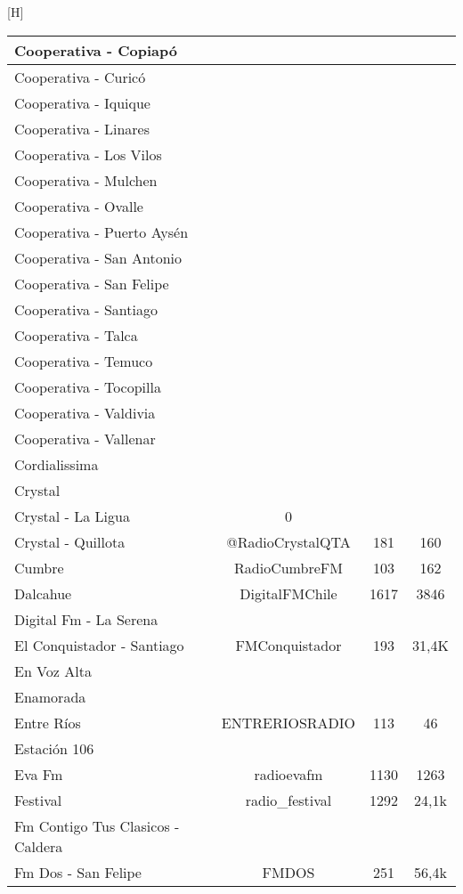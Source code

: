 \begin{center}[H]
\begin{longtable}{| l | c | c | c |}
Cooperativa - Copiapó	&		&		&		\\ \hline
Cooperativa - Curicó	&		&		&		\\ \hline
Cooperativa - Iquique	&		&		&		\\ \hline
Cooperativa - Linares	&		&		&		\\ \hline
Cooperativa - Los Vilos	&		&		&		\\ \hline
Cooperativa - Mulchen	&		&		&		\\ \hline
Cooperativa - Ovalle	&		&		&		\\ \hline
Cooperativa - Puerto Aysén	&		&		&		\\ \hline
Cooperativa - San Antonio	&		&		&		\\ \hline
Cooperativa - San Felipe	&		&		&		\\ \hline
Cooperativa - Santiago	&		&		&		\\ \hline
Cooperativa - Talca	&		&		&		\\ \hline
Cooperativa - Temuco	&		&		&		\\ \hline
Cooperativa - Tocopilla	&		&		&		\\ \hline
Cooperativa - Valdivia	&		&		&		\\ \hline
Cooperativa - Vallenar	&		&		&		\\ \hline
Cordialissima	&		&		&		\\ \hline
Crystal	&		&		&		\\ \hline
Crystal - La Ligua	&	0	&		&		\\ \hline
Crystal - Quillota	&	@RadioCrystalQTA	&	181	&	160	\\ \hline
Cumbre	&	RadioCumbreFM	&	103	&	162	\\ \hline
Dalcahue	&	DigitalFMChile	&	1617	&	3846	\\ \hline
Digital Fm - La Serena	&		&		&		\\ \hline
El Conquistador - Santiago	&	FMConquistador	&	193	&	31,4K	\\ \hline
En Voz Alta	&		&		&		\\ \hline
Enamorada	&		&		&		\\ \hline
Entre Ríos	&	ENTRERIOSRADIO	&	113	&	46	\\ \hline
Estación 106	&		&		&		\\ \hline
Eva Fm	&	radioevafm	&	1130	&	1263	\\ \hline
Festival	&	radio\_festival	&	1292	&	24,1k	\\ \hline
Fm Contigo Tus Clasicos - Caldera	&		&		&		\\ \hline
Fm Dos - San Felipe	&	FMDOS	&	251	&	56,4k	\\ \hline

\end{longtable}
\end{center}
